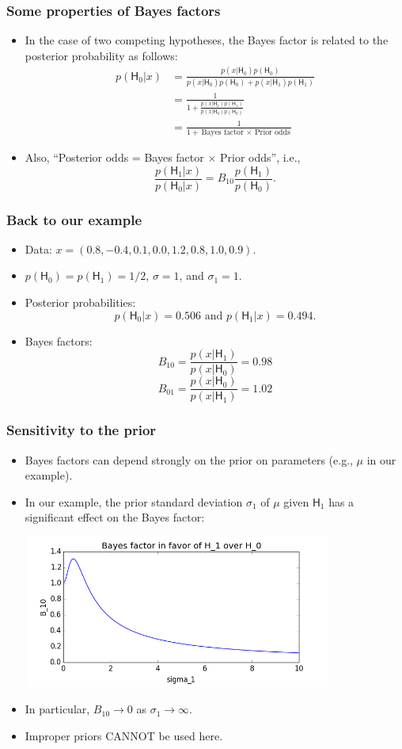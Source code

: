 \documentclass[handout]{beamer}
\def\H{\textsf{H}}
\begin{document}
\begin{frame}
\frametitle{Some properties of Bayes factors}
\begin{itemize}
\item In the case of two competing hypotheses, the Bayes factor is related to the posterior probability as follows:
\begin{align*}
p(\H_0|x) & =\frac{p(x|\H_0) p(\H_0)}{p(x|\H_0) p(\H_0) + p(x|\H_1) p(\H_1)}\\
& =\frac{1}{1+\frac{p(x|\H_1)p(\H_1)}{p(x|\H_0) p(\H_0)}}\\
& =\frac{1}{1+\mbox{Bayes factor $\times$ Prior odds}}
\end{align*}
\item Also, ``Posterior odds = Bayes factor $\times$ Prior odds'', i.e.,
$$\frac{p(\H_1|x)}{p(\H_0|x)} = B_{10} \frac{p(\H_1)}{p(\H_0)}. $$
\end{itemize}
\end{frame}


\begin{frame}
\frametitle{Back to our example}
\begin{itemize}
\item Data: $x = (0.8, -0.4, 0.1, 0.0, 1.2, 0.8, 1.0, 0.9).$
\item $p(\H_0) = p(\H_1) = 1/2$, $\sigma = 1$, and $\sigma_1 = 1$.
\item Posterior probabilities:
$$ p(\H_0|x) = 0.506 \mbox{ and } p(\H_1|x) = 0.494.$$
\item Bayes factors:
$$ B_{10} = \frac{p(x|\H_1)}{p(x|\H_0)} = 0.98$$
$$ B_{01} = \frac{p(x|\H_0)}{p(x|\H_1)} = 1.02$$
\end{itemize}
\end{frame}



\begin{frame}
\frametitle{Sensitivity to the prior}
\begin{itemize}
\item Bayes factors can depend strongly on the prior on parameters (e.g., $\mu$ in our example).
\item In our example, the prior standard deviation $\sigma_1$ of $\mu$ given $\H_1$ has a significant effect on the Bayes factor:
\centerline{\includegraphics[width=0.8\textwidth]{Bayes_factors.png}}
\item In particular, $B_{10}\to 0$ as $\sigma_1\to\infty$.
\item Improper priors CANNOT be used here.
\end{itemize}
\end{frame}
\end{document}
